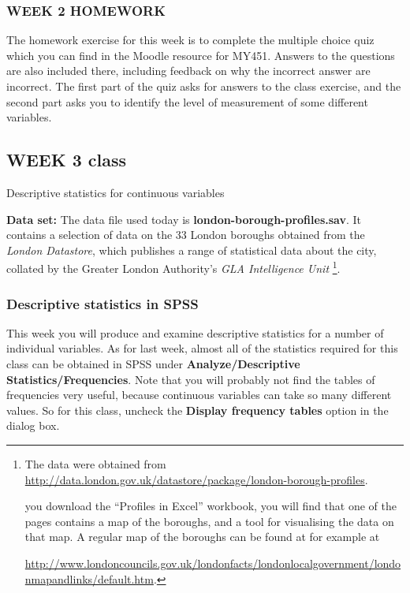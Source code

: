 \documentclass[11pt,a4paper,openany]{book}
\let\rmarkdownfootnote\footnote%
\def\footnote{\protect\rmarkdownfootnote}
\begin{document}
\subsubsection*{WEEK 2 HOMEWORK}\label{week-2-homework}

The homework exercise for this week is to complete the multiple choice
quiz which you can find in the Moodle resource for MY451. Answers to the
questions are also included there, including feedback on why the
incorrect answer are incorrect. The first part of the quiz asks for
answers to the class exercise, and the second part asks you to identify
the level of measurement of some different variables.

\clearpage

\subsection{WEEK 3 class}\label{week-3-class}

Descriptive statistics for continuous variables

\textbf{Data set:} The data file used today is
\textbf{london-borough-profiles.sav}. It contains a selection of data on
the 33 London boroughs obtained from the \emph{London Datastore}, which
publishes a range of statistical data about the city, collated by the
Greater London Authority's \emph{GLA Intelligence Unit} \footnote{The
  data were obtained from
  \url{http://data.london.gov.uk/datastore/package/london-borough-profiles}.

  \noindentIf you download the ``Profiles in Excel'' workbook, you will
  find that one of the pages contains a map of the boroughs, and a tool
  for visualising the data on that map. A regular map of the boroughs
  can be found at for example at

  \url{http://www.londoncouncils.gov.uk/londonfacts/londonlocalgovernment/londonmapandlinks/default.htm}.}.

\subsubsection*{Descriptive statistics in
SPSS}\label{descriptive-statistics-in-spss}

This week you will produce and examine descriptive statistics for a
number of individual variables. As for last week, almost all of the
statistics required for this class can be obtained in SPSS under
\textbf{Analyze/Descriptive Statistics/Frequencies}. Note that you will
probably not find the tables of frequencies very useful, because
continuous variables can take so many different values. So for this
class, uncheck the \textbf{Display frequency tables} option in the
dialog box.
\end{document}
